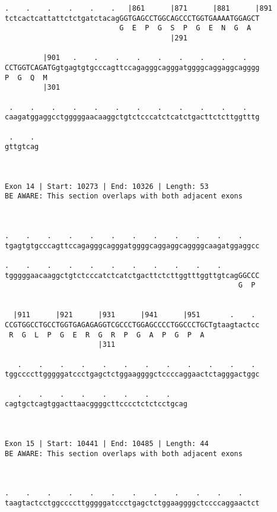 \documentclass{article}
\begin{document}
\begin{Verbatim}
.    .    .    .    .    .   |861      |871      |881      |891
tctcactcattattctctgatctacagGGTGAGCCTGGCAGCCCTGGTGAAAATGGAGCT
                           G  E  P  G  S  P  G  E  N  G  A  
                                       |291                 
  
         |901   .    .    .    .    .    .    .    .    .   
CCTGGTCAGATGgtgagtgtgcccagttccagagggcagggatggggcaggaggcagggg
P  G  Q  M                                                  
         |301                                               
  
 .    .    .    .    .    .    .    .    .    .    .    .   
caagatggaggcctgggggaacaaggctgtctcccatctcatctgacttctcttggtttg
                                                            
 .    . 
gttgtcag
        
        
 
Exon 14 | Start: 10273 | End: 10326 | Length: 53
BE AWARE: This section overlaps with both adjacent exons



.    .    .    .    .    .    .    .    .    .    .    .    
tgagtgtgcccagttccagagggcagggatggggcaggaggcaggggcaagatggaggcc
                                                            
.    .    .    .    .    .    .    .    .    .    .         
tgggggaacaaggctgtctcccatctcatctgacttctcttggtttggttgtcagGGCCC
                                                       G  P 
                                                            
  
  |911      |921      |931      |941      |951       .    . 
CCGTGGCCTGCCTGGTGAGAGAGGTCGCCCTGGAGCCCCTGGCCCTGCTgtaagtactcc
 R  G  L  P  G  E  R  G  R  P  G  A  P  G  P  A             
                      |311                                  
  
   .    .    .    .    .    .    .    .    .    .    .    . 
tggccccttgggggatccctgagctctggaaggggctccccaggaactctagggactggc
                                                            
   .    .    .    .    .    .    .    .    
cagtgctcagtggacttaacggggcttcccctctctcctgcag
                                           
                                           
 
Exon 15 | Start: 10441 | End: 10485 | Length: 44
BE AWARE: This section overlaps with both adjacent exons



.    .    .    .    .    .    .    .    .    .    .    .    
taagtactcctggccccttgggggatccctgagctctggaaggggctccccaggaactct
                                                            

\end{Verbatim}
\end{document}
